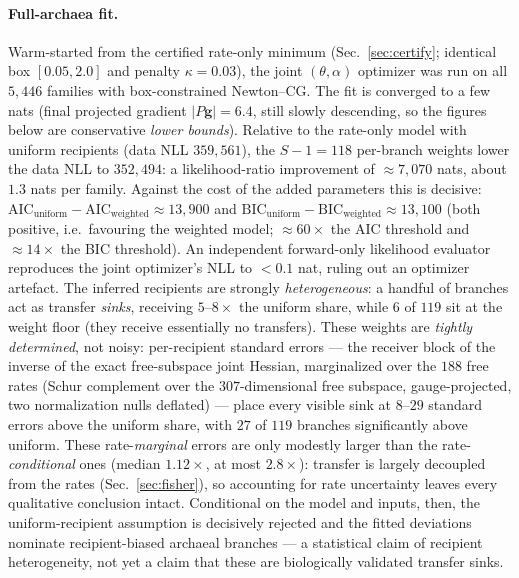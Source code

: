 \documentclass[11pt]{article}
\newcommand{\grad}{\mathbf{g}}
\begin{document}
\paragraph{Full-archaea fit.} Warm-started from the certified rate-only minimum
(Sec.~\ref{sec:certify}; identical box $[0.05,2.0]$ and penalty $\kappa{=}0.03$),
the joint $(\theta,\alpha)$ optimizer was run on all $5{,}446$ families with
box-constrained Newton--CG. The fit is converged to a few nats (final projected
gradient $|P\grad|{=}6.4$, still slowly descending, so the figures below are
conservative \emph{lower bounds}). Relative to the rate-only model with uniform
recipients (data NLL $359{,}561$), the $S{-}1{=}118$ per-branch weights lower the
data NLL to $352{,}494$: a likelihood-ratio improvement of $\approx\!7{,}070$ nats,
about $1.3$ nats per family. Against the cost of the added parameters this is
decisive: $\mathrm{AIC}_{\mathrm{uniform}}-\mathrm{AIC}_{\mathrm{weighted}}\approx
13{,}900$ and $\mathrm{BIC}_{\mathrm{uniform}}-\mathrm{BIC}_{\mathrm{weighted}}\approx
13{,}100$ (both positive, i.e.\ favouring the weighted model; $\approx\!60\times$ the
AIC threshold and $\approx\!14\times$ the BIC threshold). An independent forward-only likelihood
evaluator reproduces the joint optimizer's NLL to $<\!0.1$ nat, ruling out an
optimizer artefact. The inferred recipients are strongly \emph{heterogeneous}: a
handful of branches act as transfer \emph{sinks}, receiving $5$--$8\times$ the
uniform share, while $6$ of $119$ sit at the weight floor (they receive
essentially no transfers). These weights are \emph{tightly determined}, not noisy:
per-recipient standard errors --- the receiver block of the inverse of the exact
free-subspace joint Hessian, marginalized over the $188$ free rates (Schur complement
over the $307$-dimensional free subspace, gauge-projected, two normalization nulls
deflated) --- place every visible sink at $8$--$29$ standard errors above the uniform
share, with $27$ of $119$ branches significantly above uniform. These rate-\emph{marginal}
errors are only modestly larger than the rate-\emph{conditional} ones (median
$1.12\times$, at most $2.8\times$): transfer is largely decoupled from the rates
(Sec.~\ref{sec:fisher}), so accounting for rate uncertainty leaves every qualitative
conclusion intact. Conditional on the model and inputs, then,
the uniform-recipient assumption is decisively rejected and the fitted deviations
nominate recipient-biased archaeal branches --- a statistical claim of recipient
heterogeneity, not yet a claim that these are biologically validated transfer sinks.
\end{document}
